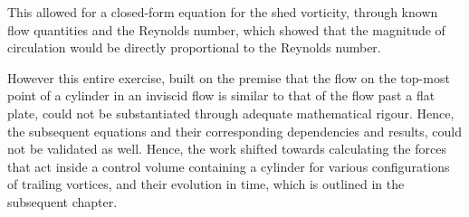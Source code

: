 This allowed for a closed-form equation for the shed vorticity, through known flow quantities and the Reynolds number, which showed that the magnitude of circulation would be directly proportional to the Reynolds number.

However this entire exercise, built on the premise that the flow on the top-most point of a cylinder in an inviscid flow is similar to that of the flow past a flat plate, could not be substantiated through adequate mathematical rigour. Hence, the subsequent equations and their corresponding dependencies and results, could not be validated as well.
Hence, the work shifted towards calculating the forces that act inside a control volume containing a cylinder for various configurations of trailing vortices, and their evolution in time, which is outlined in the subsequent chapter.
